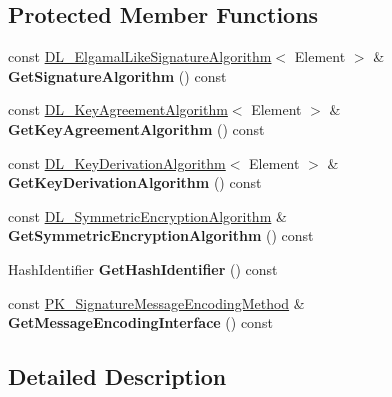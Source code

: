 \subsection*{Protected Member Functions}
\begin{DoxyCompactItemize}
\item 
\hypertarget{class_d_l___object_impl_a15f98dc0dc079075088477efebd0f7cf}{
const \hyperlink{class_d_l___elgamal_like_signature_algorithm}{DL\_\-ElgamalLikeSignatureAlgorithm}$<$ Element $>$ \& {\bfseries GetSignatureAlgorithm} () const }
\label{class_d_l___object_impl_a15f98dc0dc079075088477efebd0f7cf}

\item 
\hypertarget{class_d_l___object_impl_a59011b6b70302a949ec794babbc09a1f}{
const \hyperlink{class_d_l___key_agreement_algorithm}{DL\_\-KeyAgreementAlgorithm}$<$ Element $>$ \& {\bfseries GetKeyAgreementAlgorithm} () const }
\label{class_d_l___object_impl_a59011b6b70302a949ec794babbc09a1f}

\item 
\hypertarget{class_d_l___object_impl_acdbf31eb4f68e740191d2d0b73708109}{
const \hyperlink{class_d_l___key_derivation_algorithm}{DL\_\-KeyDerivationAlgorithm}$<$ Element $>$ \& {\bfseries GetKeyDerivationAlgorithm} () const }
\label{class_d_l___object_impl_acdbf31eb4f68e740191d2d0b73708109}

\item 
\hypertarget{class_d_l___object_impl_a3cc73ef8ba09b0ccefcbc4073fa7150e}{
const \hyperlink{class_d_l___symmetric_encryption_algorithm}{DL\_\-SymmetricEncryptionAlgorithm} \& {\bfseries GetSymmetricEncryptionAlgorithm} () const }
\label{class_d_l___object_impl_a3cc73ef8ba09b0ccefcbc4073fa7150e}

\item 
\hypertarget{class_d_l___object_impl_a13fa6f625098b2d5ab138363f4ba4bce}{
HashIdentifier {\bfseries GetHashIdentifier} () const }
\label{class_d_l___object_impl_a13fa6f625098b2d5ab138363f4ba4bce}

\item 
\hypertarget{class_d_l___object_impl_ad28756cf0e67692fdcad61450ae21f5e}{
const \hyperlink{class_p_k___signature_message_encoding_method}{PK\_\-SignatureMessageEncodingMethod} \& {\bfseries GetMessageEncodingInterface} () const }
\label{class_d_l___object_impl_ad28756cf0e67692fdcad61450ae21f5e}

\end{DoxyCompactItemize}


\subsection{Detailed Description}
